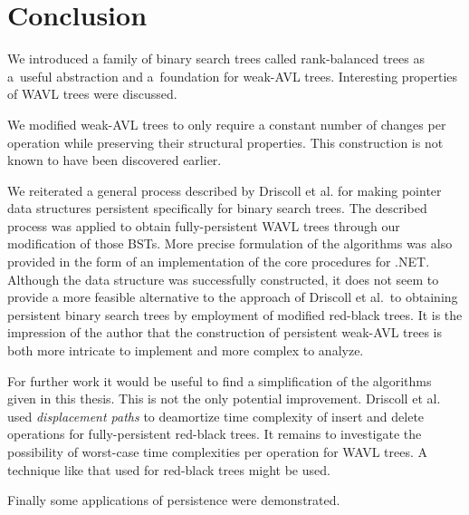 \chapter*{Conclusion}

We introduced a family of binary search trees called rank-balanced trees as a~useful abstraction and a~foundation for weak-AVL trees. Interesting properties of WAVL trees were discussed.

We modified weak-AVL trees to only require a constant number of changes per operation while preserving their structural properties. 
This construction is not known to have been discovered earlier.

We reiterated a general process described by Driscoll et al. \cite{persistence-DSST} for making pointer data structures persistent specifically for binary search trees. 
The described process was applied to obtain fully-persistent WAVL trees through our modification of those BSTs. 
More precise formulation of the algorithms was also provided in the form of an implementation of the core procedures for .NET. 
Although the data structure was successfully constructed, 
it does not seem to provide a more feasible alternative to the approach of Driscoll et al.~to obtaining persistent binary search trees by employment of modified red-black trees. 
It is the impression of the author that the construction of persistent weak-AVL trees is both more intricate to implement and more complex to analyze.

For further work it would be useful to find a simplification of the algorithms given in this thesis. This is not the only potential improvement.
Driscoll et al. used \textit{displacement paths} to deamortize time complexity of insert and delete operations for fully-persistent red-black trees. 
It remains to investigate the possibility of worst-case time complexities per operation for WAVL trees. A technique like that used for red-black trees might be used.

Finally some applications of persistence were demonstrated.
